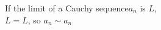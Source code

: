 \documentclass[preview]{standalone}
\begin{document}
\begin{center}
If the limit of a Cauchy sequence$a_n$ is $L$, \\$L = L$, so $a_n \sim a_n$
\end{center}
\end{document}
